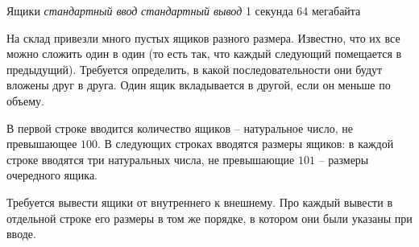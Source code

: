\begin{problem}%
{Ящики}%
{\textsl{стандартный ввод}}%
{\textsl{стандартный вывод}}%
{1 секунда}%
{64 мегабайта}{}

На склад привезли много пустых ящиков разного размера. Известно, что их все можно сложить один в один (то есть так, что каждый следующий помещается в предыдущий). Требуется определить, в какой последовательности они будут вложены друг в друга. Один ящик вкладывается в другой, если он меньше по объему.

\InputFile

В первой строке вводится количество ящиков – натуральное число, не превышающее $100$. В следующих строках вводятся размеры ящиков: в каждой строке вводятся три натуральных числа, не превышающие $101$ – размеры очередного ящика.

\OutputFile

Требуется вывести ящики от внутреннего к внешнему. Про каждый вывести в отдельной строке его размеры в том же порядке, в котором они были указаны при вводе.

\Examples

\begin{example}
%
%
\end{example}
\end{problem}